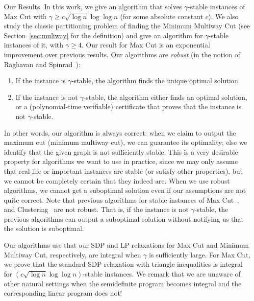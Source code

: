 \documentclass[twoside,leqno,twocolumn]{article}
\makeatletter
\def\paragraph{\@startsection  
 {paragraph}{4}{\parindent}{5pt}{-5pt}{\normalsize\bf}}
\makeatother
\begin{document}
\paragraph{Our Results.} In this work, we give an algorithm that solves $\gamma$-stable instances of Max Cut with $\gamma \geq c\sqrt{\log n} \log\log n$ (for some absolute constant $c$). We also study the classic partitioning problem of finding the Minimum Multiway Cut (see Section~\ref{sec:muliway} for the definition) and give an algorithm for $\gamma$-stable instances of it, with $\gamma\geq 4$. 
Our result for Max Cut is an
exponential improvement over previous results. Our algorithms are {\em robust} (in the notion of 
Raghavan and Spinrad~\cite{RS}):
\begin{enumerate}
\item If the instance is $\gamma$-stable, the algorithm finds the unique optimal solution.
\item If the instance is not $\gamma$-stable, the algorithm either finds an optimal solution, or a (polynomial-time verifiable) certificate that proves that the instance is not $\gamma$-stable. 
\end{enumerate}   
In other words, our algorithm is always correct: when we claim to output the maximum cut (minimum multiway cut), 
we can guarantee its optimality; else we identify that the given graph is not sufficiently stable. This is a very desirable property for algorithms we want to use in practice,
since we may only assume that real-life or important instances are stable (or satisfy other properties), but we cannot be 
completely certain that they indeed are. When we use robust algorithms, we cannot get a suboptimal solution even if our assumptions are not quite correct.
Note that previous algorithms for stable instances of Max Cut~\cite{BL,BDLS}, and Clustering~\cite{BBG,BalcanL,Awasthietal} are not robust. That is, if the instance is not $\gamma$-stable, the previous algorithms can output a suboptimal solution without notifying us that the 
solution is suboptimal.

Our algorithms use that our SDP and LP relaxations for Max Cut and Minimum Multiway Cut, respectively, are integral
when $\gamma$ is sufficiently large. 
For Max Cut, we prove that the standard SDP relaxation with triangle inequalities is integral for $(c\sqrt{\log n}\log\log n)$-stable instances.
We remark that we are unaware of other natural settings when the semidefinite program becomes integral and the corresponding linear program does not! 
\end{document}
